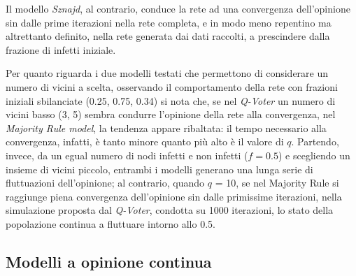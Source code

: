    Il modello \textit{Sznajd}, al contrario, conduce la rete ad una convergenza dell’opinione sin dalle prime iterazioni nella rete completa, e in modo meno repentino ma altrettanto definito, nella rete generata dai dati raccolti, a prescindere dalla frazione di infetti iniziale.
    
    Per quanto riguarda i due modelli testati che permettono di considerare un numero di vicini a scelta, osservando il comportamento della rete con frazioni iniziali sbilanciate (0.25, 0.75, 0.34) si nota che, se nel \textit{Q-Voter} un numero di vicini basso (3, 5) sembra condurre l'opinione della rete alla convergenza, nel \textit{Majority Rule model}, la tendenza appare ribaltata: il tempo necessario alla convergenza, infatti, è tanto minore quanto più alto è il valore di $q$. 
    Partendo, invece, da un egual numero di nodi infetti e non infetti ($f = 0.5$) e scegliendo un insieme di vicini piccolo, entrambi i modelli generano una lunga serie di fluttuazioni dell'opinione; al contrario, quando $q$ = 10, se nel Majority Rule si raggiunge piena convergenza dell'opinione sin dalle primissime iterazioni, nella simulazione proposta dal \textit{Q-Voter}, condotta su 1000 iterazioni, lo stato della popolazione continua a fluttuare intorno allo 0.5. 
    
    
    \subsection{Modelli a opinione continua}
    
